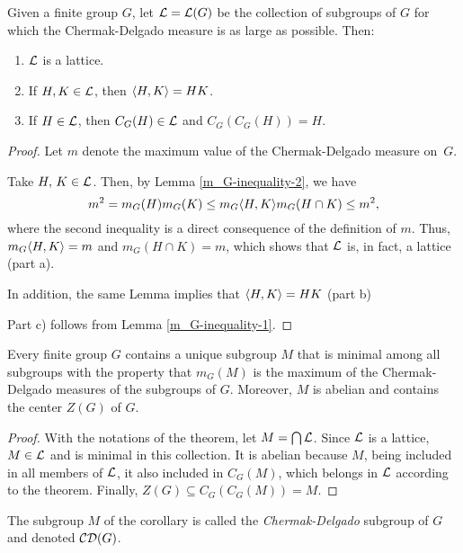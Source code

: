 \begin{thm}\label{stronger-chermak-delgado}
    Given a finite group\/ $G$, let\/ ${\cal L} = {\cal L}(G)$ be the collection of subgroups of\/ $G$ for which the Chermak-Delgado measure is as large as possible. Then:
    \begin{enumerate}[\rm a)]
    \item $\cal L$ is a lattice.
    \item If\/ $H,K\in\cal L$, then $\langle H,K\rangle = HK$.
    \item If\/ $H\in\cal L$, then $C_G(H)\in\cal L$ and $C_G(C_G(H)) = H$.
    \end{enumerate}
\end{thm}

\begin{proof} Let $m$ denote the maximum value of the Chermak-Delgado measure on~$G$.

Take $H,\,K\in\cal L$. Then, by Lemma \ref{m_G-inequality-2}, we have
$$
    m^2 = m_G(H)m_G(K) \le m_G\langle H,K\rangle m_G(H\cap K) \le m^2,
$$
where the second inequality is a direct consequence of the definition of $m$. Thus, $m_G\langle H,K\rangle=m$ and $m_G(H\cap K)=m$, which shows that $\cal L$ is, in fact, a lattice (part a).

In addition, the same Lemma implies that $\langle H,K\rangle=HK$ (part b)

Part c) follows from Lemma \ref{m_G-inequality-1}.  \end{proof}

\begin{cor}\label{m_G-is-max}
   Every finite group\/ $G$ contains a unique subgroup\/ $M$ that is minimal among all subgroups with the property that\/ $m_G(M)$ is the maximum of the Chermak-Delgado measures of the subgroups of $G$. Moreover, $M$ is abelian and contains the center\/ $Z(G)$ of\/ $G$.
\end{cor}

\begin{proof} With the notations of the theorem, let $M=\bigcap\cal L$. Since $\cal L$ is a lattice, $M\in\cal L$ and is minimal in this collection. It is abelian because $M$, being included in all members of $\cal L$, it also included in $C_G(M)$, which belongs in $\cal L$ according to the theorem. Finally, $Z(G)\subseteq C_G(C_G(M))=M$.  \end{proof}

\begin{defn}
    The subgroup\/ $M$ of the corollary is called the \textsl{Chermak-Delgado} subgroup of\/ $G$ and denoted\/ $\operatorname{{\cal CD}}(G)$.
\end{defn}

